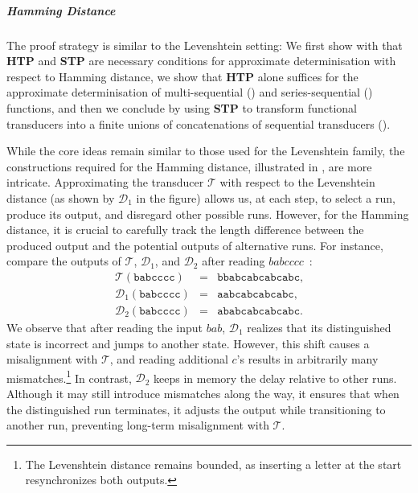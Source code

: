 \documentclass[a4paper,UKenglish,cleveref, autoref, thm-restate,authorcolumns, colorlinks]{lipics-v2021}
\newcommand\calD{\mathcal{D}}
\newcommand\calT{\mathcal{T}}
\newcommand{\trans}{\mathcal{T}}
\newcommand{\STP}[0]{\textbf{STP}}
\newcommand{\HTP}[0]{\textbf{HTP}}
\begin{document}
\vspace{-0.3cm}
 \subparagraph*{Hamming Distance} 
The proof strategy is similar to the Levenshtein setting:
We first show with 
that \HTP{} and \STP{} are necessary conditions
for approximate determinisation with respect to Hamming distance,
we show that \HTP{} alone suffices for the approximate determinisation
of multi-sequential () and
series-sequential () functions,
and then we conclude by using \STP{} to transform functional transducers
into a finite unions of concatenations of sequential transducers ().

While the core ideas remain similar to those used for the Levenshtein family,
the constructions required for the Hamming distance,
illustrated in ,
are more intricate.  
Approximating the transducer $\trans$ with respect to the Levenshtein distance
(as shown by $\calD_1$ in the figure) allows us, at each step, to select a run,
produce its output, and disregard other possible runs.
However, for the Hamming distance, it is crucial to carefully track the length difference
between the produced output and the potential outputs of alternative runs.  
For instance, compare the outputs of $\trans$, $\calD_1$, and $\calD_2$ after reading $babcccc$~:
\[
\begin{array}{lll}
\calT(\texttt{babcccc}) & = & \texttt{bbabcabcabcabc},\\
\calD_1(\texttt{babcccc}) & = & \texttt{aabcabcabcabc},\\
\calD_2(\texttt{babcccc}) & = & \texttt{ababcabcabcabc}.
\end{array}
\]
We observe that after reading the input $bab$,
$\calD_1$ realizes that its distinguished state is incorrect and jumps to another state.
However, this shift causes a misalignment with $\trans$,
and reading additional $c$'s results in arbitrarily
many mismatches.\footnote{The Levenshtein distance remains bounded, as inserting a letter at the start resynchronizes both outputs.}  
In contrast, $\calD_2$ keeps in memory the delay relative to other runs.
Although it may still introduce mismatches along the way,
it ensures that when the distinguished run terminates,
it adjusts the output while transitioning to another run,
preventing long-term misalignment with $\trans$.
\end{document}
